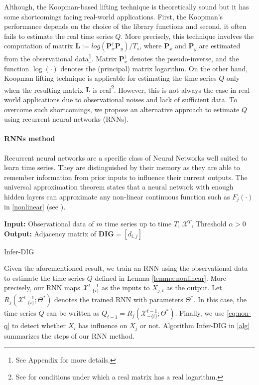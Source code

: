 Although, the Koopman-based lifting technique is theoretically sound but it has some shortcomings facing real-world applications.
First, the Koopman's performance depends on the choice of the library functions and second, it often fails to estimate the real time series $Q$.
More precisely, this technique involves the computation of matrix $\textbf{L}:=log(\textbf{P}_x^{\dagger}\textbf{P}_y)/T_s$, where $\textbf{P}_x$ and $\textbf{P}_y$ are estimated from the observational data\footnote{See Appendix for more details.}.
Matrix $\textbf{P}_x^{\dagger}$ denotes the pseudo-inverse, and the function $\log(\cdot)$ denotes the (principal) matrix logarithm.
On the other hand, Koopman lifting technique is applicable for estimating the time series $Q$ only when the resulting matrix $\textbf{L}$ is real\footnote{See \citet{culver1966existence} for conditions under which a real matrix has a real logarithm.}.
However, this is not always the case in real-world applications due to observational noises and lack of sufficient data. 
To overcome such shortcomings, we propose an alternative approach to estimate $Q$ using recurrent neural networks (RNNs).

\paragraph{RNNs method}
 Recurrent neural networks are a specific class of Neural Networks well suited to learn time series. 
 They are distinguished by their memory as they are able to remember information from prior inputs to influence their current outputs.
 The universal approximation theorem states that a neural network with enough hidden layers can approximate any non-linear continuous function such as $F_j(\cdot)$ in \eqref{nonlinear} (see \citet{HORNIK1989359}). 
 
 \begin{algorithm}[t]
 \textbf{Input:} Observational data of $m$ time series up to time $T$, $\mathcal{X}^T$, Threshold $\alpha>0$\;
 \textbf{Output:} Adjacency matrix of $\textbf{DIG}=[d_{i,j}]$\;
 \caption{Infer-DIG}\label{alg}
\end{algorithm}
 Given the aforementioned result, we train an RNN using the observational data to estimate the time series $Q$ defined in Lemma \ref{lemma:nonlinear}.
 More precisely, our RNN maps $\mathcal{X}_{-\{i\}}^{t-1}$ as the inputs to $X_{j,t}$ as the output. 
 Let $R_j(\mathcal{X}_{-\{i\}}^{t-1};\Theta^*)$ denotes the trained RNN with parameters $\Theta^*$. 
 In this case, the time series $Q$ can be written as  $Q_{t-1}=R_{j}(\mathcal{X}_{-\{i\}}^{t-1};\Theta^*)$.
 Finally, we use \eqref{eq:non-q} to detect whether $X_i$ has influence on $X_j$ or not. 
 Algorithm Infer-DIG in \ref{alg} summarizes the steps of our RNN method.




